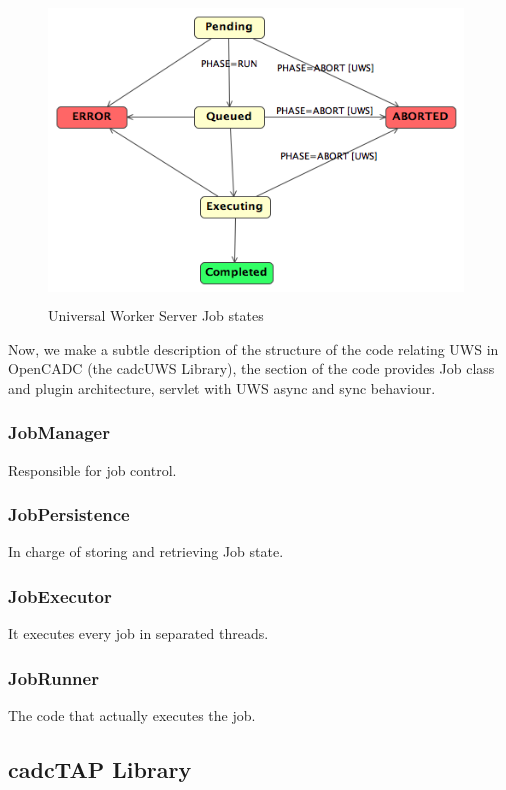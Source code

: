 \begin{figure}[tb]
\centering
\includegraphics[width=11cm,height=8cm]{images/UWSStates.png}
\caption{Universal Worker Server Job states}
\end{figure}

Now, we make a subtle description of the structure of the code relating UWS in OpenCADC (the cadcUWS Library), the section of the code provides Job class and plugin architecture, servlet with UWS async and sync behaviour.

\subsubsection{JobManager}

Responsible for job control.

\subsubsection{JobPersistence}

In charge of storing and retrieving Job state.

\subsubsection{JobExecutor}

It executes every job in separated threads.

\subsubsection{JobRunner}

The code that actually executes the job.


\subsection{cadcTAP Library}

